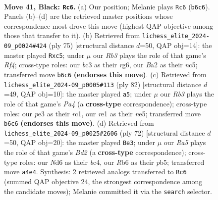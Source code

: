 \documentclass[11pt]{article}
\begin{document}
\clearpage

\begin{figure}[p]\centering
\begin{subfigure}{0.46\textwidth}\centering
\resizebox{\linewidth}{!}{%
\newchessgame
\chessboard[
  setfen={5k2/3R4/1r1n4/1p4p1/r7/2B1P1P1/b4PKP/4R3 b - - 1 41},
  showmover=false,
  pgfstyle=straightmove, color=movearrow, markmove={b6-c6}
]}
\caption{}
\end{subfigure}\hfill
\begin{subfigure}{0.46\textwidth}\centering
\resizebox{\linewidth}{!}{%
\newchessgame
\chessboard[
  setfen={5k2/5n1R/2p3R1/2N2r1p/2P5/1P5P/P5PK/3r4 b - - 0 38},
  showmover=false,
  pgfstyle=straightmove, color=movearrow, markmove={f5-c5}
]}
\caption{}
\end{subfigure}
\\[4pt]
\begin{subfigure}{0.46\textwidth}\centering
\resizebox{\linewidth}{!}{%
\newchessgame
\chessboard[
  setfen={8/4kp2/K3p2p/1N2n1p1/P2R4/6P1/1r6/2r5 w - - 0 42},
  showmover=false,
  pgfstyle=straightmove, color=movearrow, markmove={a4-a5}
]}
\caption{}
\end{subfigure}\hfill
\begin{subfigure}{0.46\textwidth}\centering
\resizebox{\linewidth}{!}{%
\newchessgame
\chessboard[
  setfen={4r3/2p2kp1/p1p2p2/Pp5P/2bR2P1/8/1P1B1K2/8 w - - 3 37},
  showmover=false,
  pgfstyle=straightmove, color=movearrow, markmove={d2-e3}
]}
\caption{}
\end{subfigure}
\caption{\textbf{Move 41, Black: \texttt{Rc6}.} (a) Our position; Melanie plays \texttt{Rc6} (\texttt{b6c6}). Panels (b)--(d) are the retrieved master positions whose correspondence most drove this move (highest QAP objective among those that transfer to it). (b) Retrieved from \texttt{lichess\_elite\_2024-09\_p0024\#424} (ply 75) [structural distance $d$=50, QAP obj=14]: the master played \texttt{Rxc5}; under $\mu$ our \emph{Rb3} plays the role of that game's \emph{Rf4}; cross-type roles: our \emph{b}c3 as their \emph{r}g6, our \emph{B}a2 as their \emph{n}c5; transferred move \texttt{b6c6} \textbf{(endorses this move)}. (c) Retrieved from \texttt{lichess\_elite\_2024-09\_p0005\#113} (ply 82) [structural distance $d$=49, QAP obj=10]: the master played \texttt{a5}; under $\mu$ our \emph{Rb3} plays the role of that game's \emph{Pa4} (a \textbf{cross-type} correspondence); cross-type roles: our \emph{p}e3 as their \emph{r}c1, our \emph{r}e1 as their \emph{n}e5; transferred move \texttt{b6c6} \textbf{(endorses this move)}. (d) Retrieved from \texttt{lichess\_elite\_2024-09\_p0025\#2606} (ply 72) [structural distance $d$=50, QAP obj=20]: the master played \texttt{Be3}; under $\mu$ our \emph{Ra5} plays the role of that game's \emph{Bd2} (a \textbf{cross-type} correspondence); cross-type roles: our \emph{N}d6 as their \emph{b}c4, our \emph{R}b6 as their \emph{p}b5; transferred move \texttt{a4e4}. Synthesis: 2 retrieved analogs transferred to \texttt{Rc6} (summed QAP objective 24, the strongest correspondence among the candidate moves); Melanie committed it via the \texttt{search} selector.}
\label{fig:thought-m81}
\end{figure}
\end{document}
